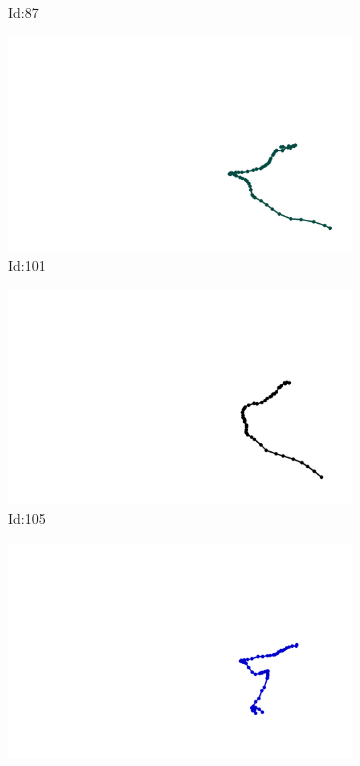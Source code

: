 \documentclass[12pt,twoside]{report}
\begin{document}
\begin{figure}
\begin{subfigure}[b]{0.20\textwidth}
\caption{Id:87}
\end{subfigure}
\begin{subfigure}[b]{0.20\textwidth}
\centering
\includegraphics[width=\textwidth]{../trajectories/101.png}
\caption{Id:101}
\end{subfigure}
\begin{subfigure}[b]{0.20\textwidth}
\centering
\includegraphics[width=\textwidth]{../trajectories/105.png}
\caption{Id:105}
\end{subfigure}
\begin{subfigure}[b]{0.20\textwidth}
\centering
\includegraphics[width=\textwidth]{../trajectories/116.png}

\end{subfigure}
\end{figure}
\end{document}
